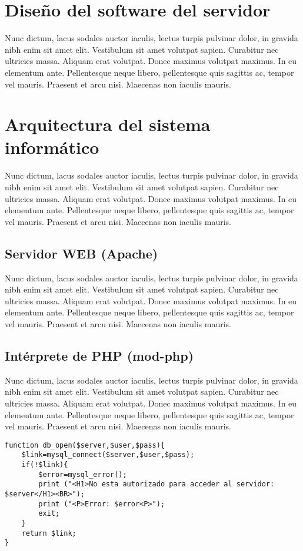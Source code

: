 \section{Diseño del software del servidor}

Nunc dictum, lacus sodales auctor iaculis, lectus turpis pulvinar dolor, in
gravida nibh enim sit amet elit. Vestibulum sit amet volutpat sapien. Curabitur
nec ultricies massa. Aliquam erat volutpat. Donec maximus volutpat maximus. In
eu elementum ante. Pellentesque neque libero, pellentesque quis sagittis ac,
tempor vel mauris. Praesent et arcu nisi. Maecenas non iaculis mauris.

\section{Arquitectura del sistema informático}

Nunc dictum, lacus sodales auctor iaculis, lectus turpis pulvinar dolor, in
gravida nibh enim sit amet elit. Vestibulum sit amet volutpat sapien. Curabitur
nec ultricies massa. Aliquam erat volutpat. Donec maximus volutpat maximus. In
eu elementum ante. Pellentesque neque libero, pellentesque quis sagittis ac,
tempor vel mauris. Praesent et arcu nisi. Maecenas non iaculis mauris.

\subsection{Servidor WEB (Apache)}

Nunc dictum, lacus sodales auctor iaculis, lectus turpis pulvinar dolor, in
gravida nibh enim sit amet elit. Vestibulum sit amet volutpat sapien. Curabitur
nec ultricies massa. Aliquam erat volutpat. Donec maximus volutpat maximus. In
eu elementum ante. Pellentesque neque libero, pellentesque quis sagittis ac,
tempor vel mauris. Praesent et arcu nisi. Maecenas non iaculis mauris.

\subsection{Intérprete de PHP (mod-php)}

Nunc dictum, lacus sodales auctor iaculis, lectus turpis pulvinar dolor, in
gravida nibh enim sit amet elit. Vestibulum sit amet volutpat sapien. Curabitur
nec ultricies massa. Aliquam erat volutpat. Donec maximus volutpat maximus. In
eu elementum ante. Pellentesque neque libero, pellentesque quis sagittis ac,
tempor vel mauris. Praesent et arcu nisi. Maecenas non iaculis mauris.

\begin{lstlisting}
function db_open($server,$user,$pass){
	$link=mysql_connect($server,$user,$pass);
    if(!$link){
    	$error=mysql_error();
        print ("<H1>No esta autorizado para acceder al servidor: $server</H1><BR>");
        print ("<P>Error: $error<P>");
        exit;
    }
    return $link;
}
\end{lstlisting}

